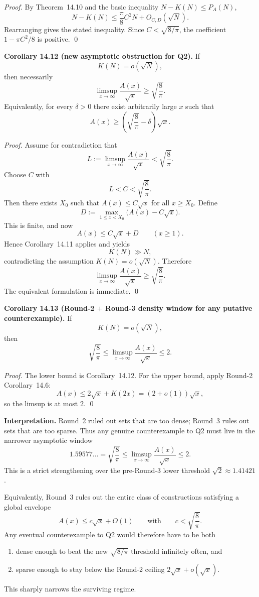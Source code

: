 \noindent\textit{Proof.}
By Theorem~14.10 and the basic inequality $N-K(N)\le P_A(N)$,
\[
N-K(N)\le \frac{\pi}{8}C^2N+O_{C,D}(\sqrt N).
\]
Rearranging gives the stated inequality. Since $C<\sqrt{8/\pi}$, the coefficient $1-\pi C^2/8$ is positive. \qed

\medskip

\noindent\textbf{Corollary 14.12 (new asymptotic obstruction for Q2).}
If
\[
K(N)=o(\sqrt N),
\]
then necessarily
\[
\limsup_{x\to\infty}\frac{A(x)}{\sqrt x}
\ge
\sqrt{\frac{8}{\pi}}.
\]
Equivalently, for every $\delta>0$ there exist arbitrarily large $x$ such that
\[
A(x)\ge \left(\sqrt{\frac{8}{\pi}}-\delta\right)\sqrt x.
\]

\noindent\textit{Proof.}
Assume for contradiction that
\[
L:=\limsup_{x\to\infty}\frac{A(x)}{\sqrt x}<\sqrt{\frac{8}{\pi}}.
\]
Choose $C$ with
\[
L<C<\sqrt{\frac{8}{\pi}}.
\]
Then there exists $X_0$ such that $A(x)\le C\sqrt x$ for all $x\ge X_0$. Define
\[
D:=\max_{1\le x<X_0}\bigl(A(x)-C\sqrt x\bigr).
\]
This is finite, and now
\[
A(x)\le C\sqrt x + D
\qquad (x\ge 1).
\]
Hence Corollary~14.11 applies and yields
\[
K(N)\gg N,
\]
contradicting the assumption $K(N)=o(\sqrt N)$. Therefore
\[
\limsup_{x\to\infty}\frac{A(x)}{\sqrt x}\ge \sqrt{\frac{8}{\pi}}.
\]
The equivalent formulation is immediate. \qed

\medskip

\noindent\textbf{Corollary 14.13 (Round-2 $+$ Round-3 density window for any putative counterexample).}
If
\[
K(N)=o(\sqrt N),
\]
then
\[
\sqrt{\frac{8}{\pi}}
\le
\limsup_{x\to\infty}\frac{A(x)}{\sqrt x}
\le 2.
\]

\noindent\textit{Proof.}
The lower bound is Corollary~14.12. For the upper bound, apply Round-2 Corollary~14.6:
\[
A(x)\le 2\sqrt{x}+K(2x)=(2+o(1))\sqrt x,
\]
so the limsup is at most $2$. \qed

\medskip

\noindent\textbf{Interpretation.}
Round~2 ruled out sets that are too dense; Round~3 rules out sets that are too sparse. Thus any genuine counterexample to Q2 must live in the narrower asymptotic window
\[
1.59577\ldots=\sqrt{\frac{8}{\pi}}
\le
\limsup_{x\to\infty}\frac{A(x)}{\sqrt x}
\le 2.
\]
This is a strict strengthening over the pre-Round-3 lower threshold $\sqrt2\approx1.41421$.

Equivalently, Round~3 rules out the entire class of constructions satisfying a global envelope
\[
A(x)\le c\sqrt x+O(1)
\qquad\mbox{with}\qquad
c<\sqrt{\frac{8}{\pi}}.
\]
Any eventual counterexample to Q2 would therefore have to be both
\begin{enumerate}
\item dense enough to beat the new $\sqrt{8/\pi}$ threshold infinitely often, and
\item sparse enough to stay below the Round-2 ceiling $2\sqrt x+o(\sqrt x)$.
\end{enumerate}
This sharply narrows the surviving regime.

